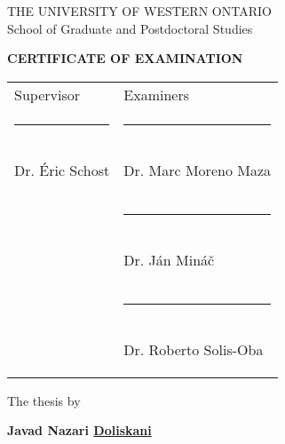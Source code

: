 
\vspace*{0.5in}

\begin{center}

THE UNIVERSITY OF WESTERN ONTARIO \\
School of Graduate and Postdoctoral Studies \\

\bigskip

\textbf{CERTIFICATE OF EXAMINATION} \\

\vspace*{0.5in}

\begin{table}[h]
\centering
\begin{tabular}{p{8cm}|p{8cm}}
\parbox{3cm}{Supervisor \\ \vspace*{10mm}} & \parbox{3cm}{Examiners \\ \vspace*{10mm}} \\
\parbox{7cm}{\rule{7cm}{0.2mm} \\ \smallskip Dr. \'{E}ric Schost \\ \vspace*{0.2in}} 
& \parbox{7cm}{\rule{7cm}{0.2mm} \\ \smallskip Dr. Marc Moreno Maza \\ \vspace*{0.2in}} \\
& \parbox{7cm}{\rule{7cm}{0.2mm} \\ \smallskip Dr. J\'{an} Min\'{a}\v{c} \\ \vspace*{0.2in}} \\
& \parbox{7cm}{\rule{7cm}{0.2mm} \\ \smallskip Dr. Roberto Solis-Oba \\ \vspace*{0.2in}}
\end{tabular}
\end{table}


\vspace*{1cm}

The thesis by \\

\vspace*{0.2cm}

\textbf{Javad Nazari \underline{Doliskani}} \\


\end{center}
